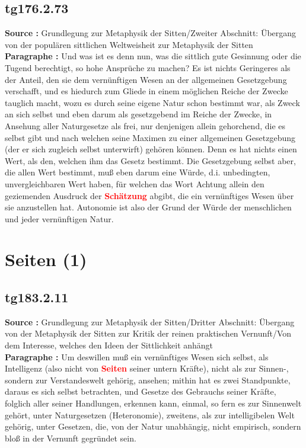\documentclass[a4paper,12pt,twoside]{book}
\newcommand{\match}[1]{\textcolor{red}{\textbf{#1}}}
\newcommand{\unnumberedsection}[1]{
	\section*{#1}
	\addcontentsline{toc}{section}{#1}
	\markright{#1}
}
\begin{document}
	\subsection*{tg176.2.73} 
	\textbf{Source : }Grundlegung zur Metaphysik der Sitten/Zweiter Abschnitt: Übergang von der populären sittlichen Weltweisheit zur Metaphysik der Sitten\\  
	
	\textbf{Paragraphe : }Und was ist es denn nun, was die sittlich gute Gesinnung oder die Tugend berechtigt, so hohe Ansprüche zu machen? Es ist nichts Geringeres als der Anteil, den sie dem vernünftigen Wesen an der allgemeinen Gesetzgebung verschafft, und es hiedurch zum Gliede in einem möglichen Reiche der Zwecke tauglich macht, wozu es durch seine eigene Natur schon bestimmt war, als Zweck an sich selbst und eben darum als gesetzgebend im Reiche der Zwecke, in Ansehung aller Naturgesetze als frei, nur denjenigen allein gehorchend, die es selbst gibt und nach welchen seine Maximen zu einer allgemeinen Gesetzgebung (der er sich zugleich selbst unterwirft) gehören können. Denn es hat nichts einen Wert, als den, welchen ihm das Gesetz bestimmt. Die Gesetzgebung selbst aber, die allen Wert bestimmt, muß eben darum eine Würde, d.i. unbedingten, unvergleichbaren Wert haben, für welchen das Wort Achtung allein den geziemenden Ausdruck der \match{Schätzung} abgibt, die ein vernünftiges Wesen über sie anzustellen hat. Autonomie ist also der Grund der Würde der menschlichen und jeder vernünftigen Natur. 
	
	\unnumberedsection{Seiten (1)} 
	\subsection*{tg183.2.11} 
	\textbf{Source : }Grundlegung zur Metaphysik der Sitten/Dritter Abschnitt: Übergang von der Metaphysik der Sitten zur Kritik der reinen praktischen Vernunft/Von dem Interesse, welches den Ideen der Sittlichkeit anhängt\\  
	
	\textbf{Paragraphe : }Um deswillen muß ein vernünftiges Wesen sich selbst, als Intelligenz (also nicht von \match{Seiten} seiner untern Kräfte), nicht als zur Sinnen-, sondern zur Verstandeswelt gehörig, ansehen; mithin hat es zwei Standpunkte, daraus es sich selbst betrachten, und Gesetze des Gebrauchs seiner Kräfte, folglich aller seiner Handlungen, erkennen kann, einmal, so fern es zur Sinnenwelt gehört, unter Naturgesetzen (Heteronomie), zweitens, als zur intelligibelen Welt gehörig, unter Gesetzen, die, von der Natur unabhängig, nicht empirisch, sondern bloß in der Vernunft gegründet sein. 
	
\end{document}
